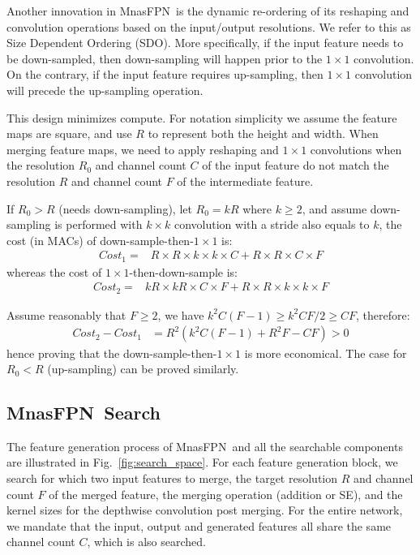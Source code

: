 \documentclass[10pt,twocolumn,letterpaper]{article}
\def\Mnasfpn{MnasFPN~}
\begin{document}
Another innovation in \Mnasfpn is the dynamic re-ordering of its reshaping and convolution operations based on the input/output resolutions. We refer to this as Size Dependent Ordering (SDO). More specifically, if the input feature needs to be down-sampled, then down-sampling will happen prior to the $1\times 1$ convolution. On the contrary, if the input feature requires up-sampling, then $1\times 1$ convolution will precede the up-sampling operation. 

This design minimizes compute. For notation simplicity we assume the feature maps are square, and use $R$ to represent both the height and width. When merging feature maps, we need to apply reshaping and $1\times 1$ convolutions when the resolution $R_0$ and channel count $C$ of the input feature do not match the resolution $R$ and channel count $F$ of the intermediate feature. 

If $R_0 > R$ (needs down-sampling), let $R_0 = kR$ where $k\geq2$, and assume down-sampling is performed with $k\times k$ convolution with a stride also equals to $k$, the cost (in MACs) of down-sample-then-$1\times1$ is:
\begin{align}
    Cost_1 =&R \times R \times k \times k \times C + R \times R \times C \times F \label{eq:cost_1}
\end{align}
whereas the cost of $1\times1$-then-down-sample is:
\begin{align}
    Cost_2 =&kR \times kR \times C \times F + R \times R \times k \times k \times F  \label{eq:cost_2}
\end{align}

Assume reasonably that $F\geq 2$, we have $k^2C(F-1)\geq k^2CF/2 \geq CF$, therefore:
\begin{align}
Cost_2 - Cost_1&= R^2\left(k^2C(F-1)+R^2F-CF\right) > 0 \label{eq:proof}
\end{align}
hence proving that the down-sample-then-$1\times 1$ is more economical. The case for $R_0 < R$ (up-sampling) can be proved similarly. 




\subsection{\Mnasfpn Search}
\label{sec:search_space}





The feature generation process of \Mnasfpn and all the searchable components are illustrated in Fig.~\ref{fig:search_space}. For each feature generation block, we search for which two input features to merge, the target resolution $R$ and channel count $F$ of the merged feature, the merging operation (addition or SE), and the kernel sizes for the depthwise convolution post merging. For the entire network, we mandate that the input, output and generated features all share the same channel count $C$, which is also searched. 
\end{document}
